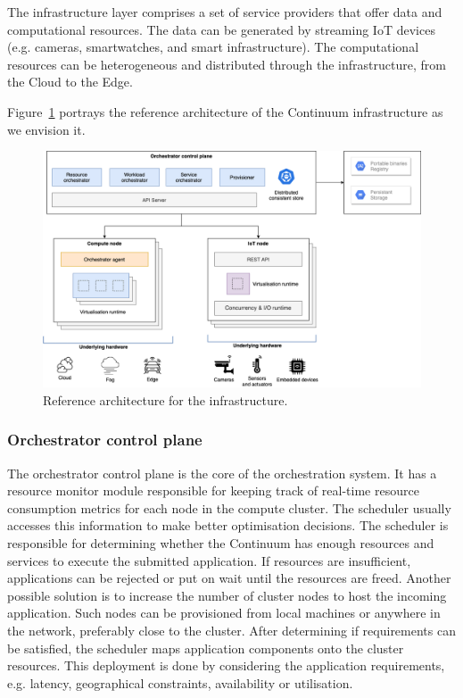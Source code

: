 The infrastructure layer comprises a set of service providers that offer data and computational resources. The data can be generated by streaming IoT devices (e.g. cameras, smartwatches, and smart infrastructure). 
The computational resources can be heterogeneous and distributed through the infrastructure, from the Cloud to the Edge.

Figure~\ref{fig:architecture-broad} portrays the reference architecture of the Continuum infrastructure as we envision it. 
\begin{figure}[ht]
\centering
\includegraphics[width=\columnwidth]{figures/architecture-broad}
\caption{Reference architecture for the infrastructure.}
\label{fig:architecture-broad}
\end{figure}

\subsubsection{Orchestrator control plane}

The orchestrator control plane is the core of the orchestration system. It has a resource monitor module responsible for keeping track of real-time resource consumption metrics for each node in the compute cluster. The scheduler usually accesses this information to make better optimisation decisions. The scheduler is responsible for determining whether the Continuum has enough resources and services to execute the submitted application. If resources are insufficient, applications can be rejected or put on wait until the resources are freed. Another possible solution is to increase the number of cluster nodes to host the incoming application. Such nodes can be provisioned from local machines or anywhere in the network, preferably close to the cluster. After determining if requirements can be satisfied, the scheduler maps application components onto the cluster resources. This deployment is done by considering the application requirements, e.g. latency, geographical constraints, availability or utilisation.

